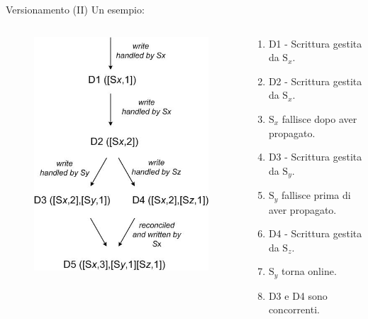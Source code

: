 \begin{frame}{Versionamento (II)}
  Un esempio:
  \begin{columns}
    \begin{column}{0.4\textwidth}
      \begin{figure}
      \centering
      \includegraphics[scale=0.4]{dynamo/versioning.png}
      \end{figure}
    \end{column}
    \begin{column}{0.6\textwidth}
    \begin{enumerate}
    \item D1 - Scrittura gestita da $\mathrm{S}_x$.
    \item D2 - Scrittura gestita da $\mathrm{S}_x$.
    \item $\mathrm{S}_x$ fallisce \alert{dopo} aver propagato.
    \item D3 - Scrittura gestita da $\mathrm{S}_y$.
    \item $\mathrm{S}_y$ fallisce \alert{prima} di aver propagato.
    \item D4 - Scrittura gestita da $\mathrm{S}_z$.
    \item $\mathrm{S}_y$ torna online.
    \item D3 e D4 sono concorrenti.
    \end{enumerate}  
    \end{column}
    \end{columns}  
\end{frame}


